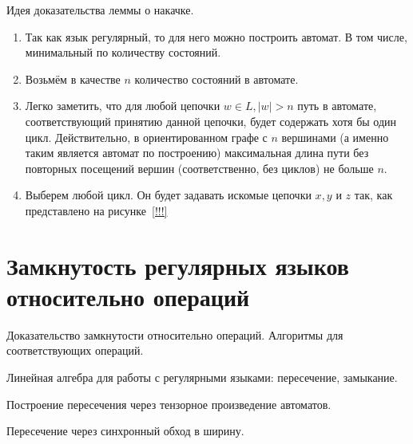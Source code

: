Идея доказательства леммы о накачке.

\begin{enumerate}
    \item Так как язык регулярный, то для него можно построить автомат. В том числе, минимальный по количеству состояний.
    \item Возьмём в качестве $n$ количество состояний в автомате.
    \item Легко заметить, что для любой цепочки $w \in L, |w| > n$ путь в автомате, соответствующий принятию данной цепочки, будет содержать хотя бы один цикл.
          Действительно, в ориентированном графе с $n$ вершинами (а именно таким является автомат по построению) максимальная длина пути без повторных посещений вершин (соответственно, без циклов) не больше $n$.
    \item Выберем любой цикл. Он будет задавать искомые цепочки $x, y$ и $z$ так, как представлено на рисунке~\ref{!!!} 
\end{enumerate}


\section{Замкнутость регулярных языков относительно операций}

Доказательство замкнутости относительно операций. Алгоритмы для соответствующих операций.

Линейная алгебра для работы с регулярными языками: пересечение, замыкание.

Построение пересечения через тензорное произведение автоматов.

Пересечение через синхронный обход в ширину.

%
%
